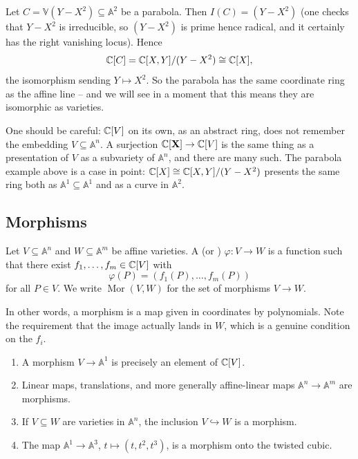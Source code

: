 \documentclass[a4paper]{scrartcl}
\newcommand{\A}{\mathbb{A}}
\newcommand{\V}{\mathbb{V}}
\DeclareMathOperator{\Mor}{Mor}
\begin{document}
\begin{example}
	Let $C = \V(Y - X^2) \subseteq \A^2$ be a parabola. Then $I(C) = (Y - X^2)$ (one checks that $Y - X^2$ is irreducible, so $(Y-X^2)$ is prime hence radical, and it certainly has the right vanishing locus). Hence
	$$\mathbb{C}[C] = \mathbb{C}[X,Y]/(Y-X^2) \cong \mathbb{C}[X],$$
	the isomorphism sending $Y \mapsto X^2$. So the parabola has the same coordinate ring as the affine line -- and we will see in a moment that this means they are isomorphic as varieties.
\end{example}

\begin{remark}
	One should be careful: $\mathbb{C}[V]$ on its own, as an abstract ring, does not remember the embedding $V \subseteq \A^n$. A surjection $\mathbb{C}[\mathbf{X}] \to \mathbb{C}[V]$ is the same thing as a presentation of $V$ as a subvariety of $\A^n$, and there are many such. The parabola example above is a case in point: $\mathbb{C}[X] \cong \mathbb{C}[X,Y]/(Y-X^2)$ presents the same ring both as $\A^1 \subseteq \A^1$ and as a curve in $\A^2$.
\end{remark}

\subsection{Morphisms}

\begin{definition}[Morphism]
	Let $V \subseteq \A^n$ and $W \subseteq \A^m$ be affine varieties. A  (or ) $\varphi \colon V \to W$ is a function such that there exist $f_1,\dots,f_m \in \mathbb{C}[V]$ with
	$$\varphi(P) = (f_1(P),\dots,f_m(P))$$
	for all $P \in V$. We write $\Mor(V,W)$ for the set of morphisms $V \to W$.
\end{definition}

In other words, a morphism is a map given in coordinates by polynomials. Note the requirement that the image actually lands in $W$, which is a genuine condition on the $f_i$.

\begin{example}
	\begin{enumerate}[label=(\roman*)]
		\item A morphism $V \to \A^1$ is precisely an element of $\mathbb{C}[V]$.
		\item Linear maps, translations, and more generally affine-linear maps $\A^n \to \A^m$ are morphisms.
		\item If $V \subseteq W$ are varieties in $\A^n$, the inclusion $V \hookrightarrow W$ is a morphism.
		\item The map $\A^1 \to \A^3$, $t \mapsto (t,t^2,t^3)$, is a morphism onto the twisted cubic.
	\end{enumerate}
\end{example}
\end{document}

